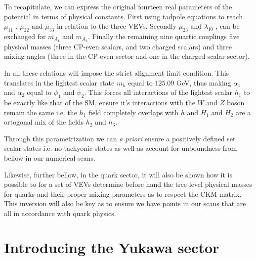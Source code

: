 To recapitulate, we can express the original fourteen real parameters of the potential in terms of physical constants. First using tadpole equations to reach $\mu_{11}$ , $\mu_{22}$ and $\mu_{33}$ in relation to the three VEVs. Secondly $\mu_{23}$ and $\lambda_10$ , can be exchanged for $m_{A_1}$ and $m_{A_2}$. Finally the remaining nine quartic couplings five physical masses (three CP-even scalars, and two charged scalars) and three mixing angles (three in the CP-even sector and one in the charged scalar sector). 

In all these relations will impose the strict alignment limit condition. This translates in the lightest scalar state $m_h$ equal to $125.09$ GeV, thus making $\alpha_1$ and $\alpha_2$ equal to $\psi_1$ and $\psi_2$. 
%
This forces all interactions of the lightest scalar $h_1$ to be exactly like that of the SM, ensure it's interactions with the $W$ and $Z$ boson remain the same i.e. the $h_1$ field completely overlaps with $h$ and $H_1$ and $H_2$ are a ortogonal mix of the fields $h_2$ and $h_3$. 

Through this parametrization we can \textit{a priori} ensure a positively defined set scalar states i.e. no tachyonic states as well as account for unboundness from bellow in our numerical scans. 

Likewise, further bellow, in the quark sector, it will also be shown how it is possible to for a set of VEVs determine before hand the tree-level physical masses for quarks and their proper mixing parameters as to respect the CKM matrix. This inversion will also be key as to ensure we have points in our scans that are all in accordance with quark physics. 


\section{Introducing the Yukawa sector}

